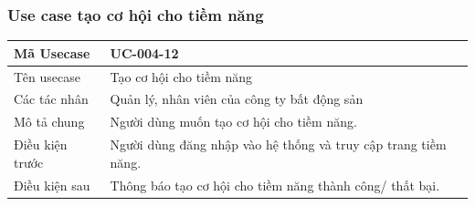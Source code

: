 \documentclass[12pt,a4paper]{article}
\begin{document}
    \subsubsection*{Use case tạo cơ hội cho tiềm năng}
    \begin{table}[H]
        \centering
        \begin{tabular}{|p{3.5cm}|p{11.5cm}|c|}
            \hline
            Mã Usecase      & UC-004-12                                                      \\
            \hline
            Tên usecase     & Tạo cơ hội cho tiềm năng                                       \\
            \hline
            Các tác nhân    & Quản lý, nhân viên của công ty bất động sản                    \\
            \hline
            Mô tả chung     & Người dùng muốn tạo cơ hội cho tiềm năng.                      \\
            \hline

            Điều kiện trước & Người dùng đăng nhập vào hệ thống và truy cập trang tiềm năng. \\
            \hline

            Điều kiện sau   & Thông báo tạo cơ hội cho tiềm năng thành công/ thất bại.       \\
            \hline


\end{tabular}
\end{table}
\end{document}
